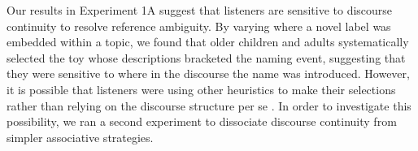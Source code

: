 \documentclass[man]{apa2}
\begin{document}
% 

Our results in Experiment 1A suggest that listeners are sensitive to discourse continuity to resolve reference ambiguity.  By varying where a novel label was embedded within a topic, we found that older children and adults systematically selected the toy whose descriptions bracketed the naming event, suggesting that they were sensitive to where in the discourse the name was introduced.  However, it is possible that listeners were using other heuristics to make their selections rather than relying on the discourse structure per se \cite{samuelson1998}.  In order to investigate this possibility, we ran a second experiment to dissociate discourse continuity from simpler associative strategies. 
\end{document}
